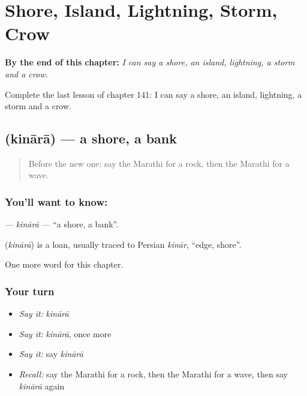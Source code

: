 
\chapter{Shore, Island, Lightning, Storm, Crow}
\label{ch:mr-shore-island-lightning-storm-crow}

\begin{chapteropening}
\textbf{By the end of this chapter:} \emph{I can say a shore, an island, lightning, a storm and a crow.}

Complete the last lesson of chapter 141: I can say a shore, an island, lightning, a storm and a crow.
\end{chapteropening}

\section[\texorpdfstring{\mr{किनारा} (kinārā)}{किनारा (kinārā)}]{ (kinārā) — a shore, a bank}

\label{lesson:MR-C141-kinara}



\begin{quote}
Before the new one: say the Marathi for a rock, then the Marathi for a wave.
\end{quote}

\subsection*{You'll want to know: }
\textbf{} — \emph{kinārā} — \textquotedblleft{}a shore, a bank\textquotedblright{}.

\begin{cousinweb}
\textbf{} (\emph{kinārā}) is a loan, usually traced to Persian \emph{kinār}, \textquotedblleft{}edge, shore\textquotedblright{}.
\end{cousinweb}

\begin{grammarlens}[title={What you've built}]
One more word for this chapter.
\end{grammarlens}

\subsection*{Your turn}
\begin{itemize}
\raggedright
  \item \emph{Say it:} \emph{kinārā}
  \item \emph{Say it:} \emph{kinārā}, once more
  \item \emph{Say it:} say \emph{kinārā}
  \item \emph{Recall:} say the Marathi for a rock, then the Marathi for a wave, then say \emph{kinārā} again
\end{itemize}

